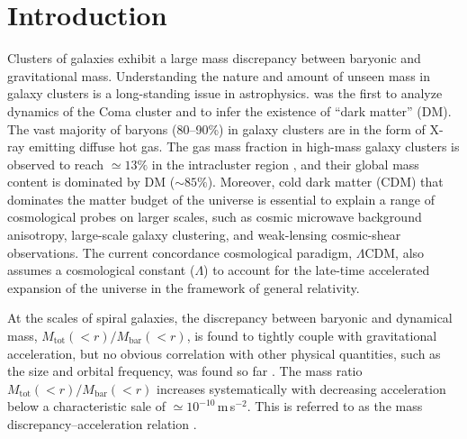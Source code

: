 \documentclass[a4paper,iop,twocolumn,twocolappendix,numberedappendix,appendixfloats]{emulateapj}
\newcommand{\percent}{\ensuremath{\%}}
\newcommand{\Mtot}{M_\mathrm{tot}}
\newcommand{\Mbar}{M_\mathrm{bar}}
\begin{document}
\section{Introduction}\label{sec:intro}

Clusters of galaxies exhibit a large mass discrepancy between baryonic and
gravitational mass. Understanding the nature and amount of unseen mass
in galaxy clusters is a long-standing issue in astrophysics.
\citet{Zwicky33} was the first to analyze dynamics of the Coma cluster and
to infer the existence of ``dark matter'' (DM).
The vast majority of baryons (80--90\%) in galaxy clusters are in the form of X-ray
emitting diffuse hot gas. The gas mass fraction in high-mass galaxy clusters
is observed to reach $\simeq 13\percent$ in the intracluster region
\citep[e.g.,][]{Vikhlinin2006_fgas,Umetsu09,planck2013fgas,Donahue14}, and
their global mass content is dominated by DM ($\sim 85\percent$).
Moreover, cold dark matter (CDM) that dominates the matter budget of the
universe is essential to explain a range of cosmological probes
on larger scales, such as cosmic microwave background
anisotropy, large-scale galaxy clustering, and weak-lensing
cosmic-shear observations.
The current concordance cosmological paradigm, $\Lambda$CDM,
also assumes a cosmological constant ($\Lambda$) to account for the late-time
accelerated expansion of the universe in the framework of general relativity.

At the scales of spiral galaxies, the discrepancy between baryonic and
    dynamical mass, $\Mtot(<r)/\Mbar(<r)$, is found to tightly couple
    with gravitational acceleration, but no obvious correlation with
    other physical quantities, such as the size and orbital frequency,
    was found so far    \citep[e.g.,][]{McGaugh04}.
    The mass ratio $\Mtot(<r)/\Mbar(<r)$ increases systematically with decreasing
    acceleration below a characteristic sale of
    $\simeq 10^{-10}$\,m\,s$^{-2}$.
    This is referred to as the mass discrepancy--acceleration relation
    \citep[MDAR; for a review, see, e.g.,][]{FM12}.
\end{document}
